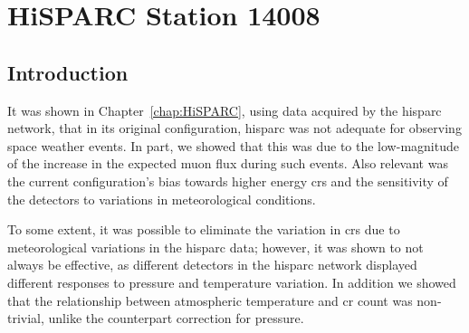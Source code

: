 \chapter{HiSPARC Station 14008}\label{chap:HiSPARC_14008}

\section{Introduction}\label{sec:HS_14008_intro}


%



It was shown in Chapter~\ref{chap:HiSPARC}, using data acquired by the \gls{hisparc} network, that in its original configuration, \gls{hisparc} was not adequate for observing space weather events. In part, we showed that this was due to the low-magnitude of the increase in the expected muon flux during such events. Also relevant was the current configuration's bias towards higher energy \glspl{cr} and the sensitivity of the detectors to variations in meteorological conditions.

To some extent, it was possible to eliminate the variation in \glspl{cr} due to meteorological variations in the \gls{hisparc} data; however, it was shown to not always be effective, as different detectors in the \gls{hisparc} network displayed different responses to pressure and temperature variation. In addition we showed that the relationship between atmospheric temperature and \gls{cr} count was non-trivial, unlike the counterpart correction for pressure.

